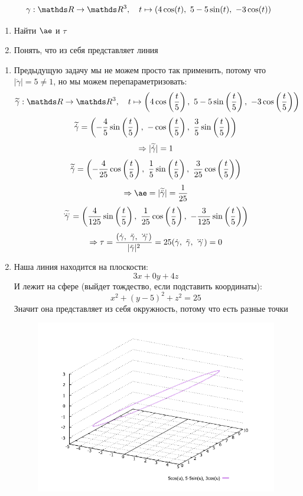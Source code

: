 \documentclass[main]{subfiles}
\begin{document}
    \begin{Task}
      \[\gamma: \R \ra \R^3,\q t \mapsto (4 \cos(t),\ 5-5 \sin(t),\ -3\cos(t))\]
      \begin{enumerate}
        \item Найти $\ae$ и $\tau$
        \item Понять, что из себя представляет линия
      \end{enumerate}
    \end{Task}

    \begin{sol}
      \begin{enumerate}
        \item Предыдущую задачу мы не можем просто так применить, потому что $|\dot{\gamma}|=5 \neq 1$, но мы можем перепараметризовать:
        \[\w{\gamma}: \R \ra \R^3,\q t \mapsto
        \Br{
            4 \cos\Br{\frac{t}{5}},\
            5-5 \sin\Br{\frac{t}{5}},\
            -3\cos\Br{\frac{t}{5}}
        }\]
        \[\widetilde{\dot{\gamma}} =
        \left(
            -\frac{4}{5} \sin\left(\frac{t}{5}\right),\
            -\cos\left(\frac{t}{5}\right),\
            \frac{3}{5} \sin\left(\frac{t}{5}\right)
        \right)\]
        \[\Rightarrow |\widetilde{\dot{\gamma}}|=1\]
        \[\widetilde{\ddot{\gamma}} =
        \left(
            -\frac{4}{25} \cos\left(\frac{t}{5}\right),\
            \frac{1}{5} \sin\left(\frac{t}{5}\right),\
            \frac{3}{25} \cos\left(\frac{t}{5}\right)
        \right)\]
        \[\Ra \ae = |\w{\ddot{\gamma}}| = \frac{1}{25}\]
        \[\widetilde{\overset{{}_{\displaystyle ...}}{\gamma}} =
        \left(
            \frac{4}{125} \sin\left(\frac{t}{5}\right),\
            \frac{1}{25} \cos\left(\frac{t}{5}\right),\
            -\frac{3}{125} \sin\left(\frac{t}{5}\right)
        \right)\]
        \[\Ra \tau = \frac{(\dot{\gamma},\ \ddot{\gamma},\ \dddot{\gamma})}{|\ddot{\gamma}|^2}=25 (\dot{\gamma},\ \ddot{\gamma},\ \dddot{\gamma})=0\]
        \item Наша линия находится на плоскости:
        \[3x+0y+4z\]
        И лежит на сфере (выйдет тождество, если подставить координаты):
        \[x^2+(y-5)^2+z^2=25\]
        Значит она представляет из себя окружность, потому что есть разные точки
        \begin{figure}[H]
            \includegraphics[scale=0.6]{pics/2_2.png}
            \centering
        \end{figure}
      \end{enumerate}
    \end{sol}
\end{document}
